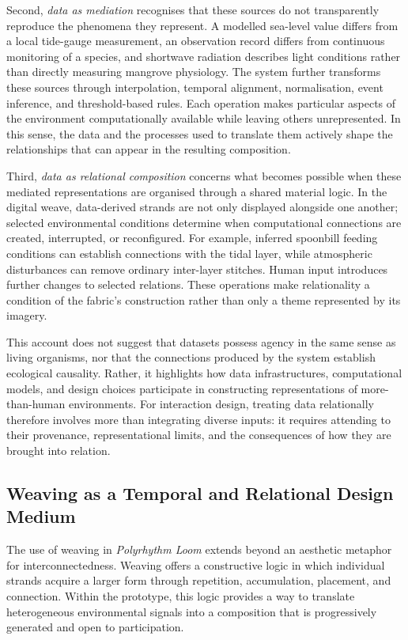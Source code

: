 \documentclass[manuscript,review,anonymous]{acmart}
\begin{document}
Second, \emph{data as mediation} recognises that these sources do not transparently reproduce the phenomena they represent. A modelled sea-level value differs from a local tide-gauge measurement, an observation record differs from continuous monitoring of a species, and shortwave radiation describes light conditions rather than directly measuring mangrove physiology. The system further transforms these sources through interpolation, temporal alignment, normalisation, event inference, and threshold-based rules. Each operation makes particular aspects of the environment computationally available while leaving others unrepresented. In this sense, the data and the processes used to translate them actively shape the relationships that can appear in the resulting composition.

Third, \emph{data as relational composition} concerns what becomes possible when these mediated representations are organised through a shared material logic. In the digital weave, data-derived strands are not only displayed alongside one another; selected environmental conditions determine when computational connections are created, interrupted, or reconfigured. For example, inferred spoonbill feeding conditions can establish connections with the tidal layer, while atmospheric disturbances can remove ordinary inter-layer stitches. Human input introduces further changes to selected relations. These operations make relationality a condition of the fabric's construction rather than only a theme represented by its imagery.

This account does not suggest that datasets possess agency in the same sense as living organisms, nor that the connections produced by the system establish ecological causality. Rather, it highlights how data infrastructures, computational models, and design choices participate in constructing representations of more-than-human environments. For interaction design, treating data relationally therefore involves more than integrating diverse inputs: it requires attending to their provenance, representational limits, and the consequences of how they are brought into relation.

\subsection{Weaving as a Temporal and Relational Design Medium}

The use of weaving in \emph{Polyrhythm Loom} extends beyond an aesthetic metaphor for interconnectedness. Weaving offers a constructive logic in which individual strands acquire a larger form through repetition, accumulation, placement, and connection. Within the prototype, this logic provides a way to translate heterogeneous environmental signals into a composition that is progressively generated and open to participation.
\end{document}
